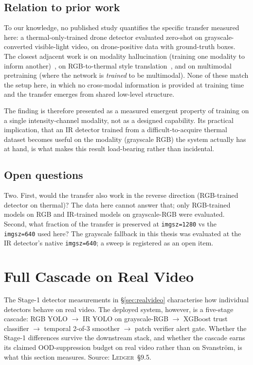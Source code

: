 \documentclass[12pt,a4paper,oneside,openright]{book}
\begin{document}
\subsection{Relation to prior work}

To our knowledge, no published study quantifies the specific transfer measured here: a thermal-only-trained drone detector evaluated zero-shot on grayscale-converted visible-light video, on drone-positive data with ground-truth boxes. The closest adjacent work is on modality hallucination (training one modality to inform another)~\cite{hoffman2016modalityhallucination}, on RGB-to-thermal style translation~\cite{berg2018rgb2thermal,kniaz2018thermalgan}, and on multimodal pretraining (where the network is \emph{trained} to be multimodal). None of these match the setup here, in which no cross-modal information is provided at training time and the transfer emerges from shared low-level structure.

The finding is therefore presented as a measured emergent property of training on a single intensity-channel modality, not as a designed capability. Its practical implication, that an IR detector trained from a difficult-to-acquire thermal dataset becomes useful on the modality (grayscale RGB) the system actually has at hand, is what makes this result load-bearing rather than incidental.

\subsection{Open questions}

Two. First, would the transfer also work in the reverse direction (RGB-trained detector on thermal)? The data here cannot answer that; only RGB-trained models on RGB and IR-trained models on grayscale-RGB were evaluated. Second, what fraction of the transfer is preserved at \texttt{imgsz=1280} vs the \texttt{imgsz=640} used here? The grayscale fallback in this thesis was evaluated at the IR detector's native \texttt{imgsz=640}; a sweep is registered as an open item.

\section{Full Cascade on Real Video}
\label{sec:realvideo_cascade}

The Stage-1 detector measurements in \S\ref{sec:realvideo} characterise how individual detectors behave on real video. The deployed system, however, is a five-stage cascade: RGB YOLO $\to$ IR YOLO on grayscale-RGB $\to$ XGBoost trust classifier $\to$ temporal 2-of-3 smoother $\to$ patch verifier alert gate. Whether the Stage-1 differences survive the downstream stack, and whether the cascade earns its claimed OOD-suppression budget on real video rather than on Svanstr\"om, is what this section measures. Source: \textsc{Ledger}~\S9.5.
\end{document}
